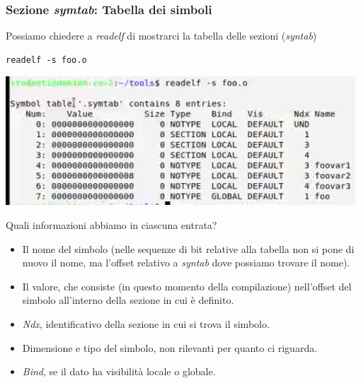 \documentclass[11pt]{report}
\theoremstyle{definition}
\begin{document}
\subsubsection{Sezione \emph{symtab}: Tabella dei simboli} Possiamo chiedere a \emph{readelf} di mostrarci la tabella delle sezioni (\emph{syntab})
\begin{verbatim}
readelf -s foo.o
\end{verbatim}\begin{center}
\includegraphics{img/55.PNG}
\end{center}  
Quali informazioni abbiamo in ciascuna entrata?
\begin{itemize}
\item Il nome del simbolo (nelle sequenze di bit relative alla tabella non si pone di nuovo il nome, ma l'offset relativo a \emph{syntab} dove possiamo trovare il nome).
\item Il valore, che consiste (in questo momento della compilazione) nell'offset del simbolo all'interno della sezione in cui è definito.
\item \emph{Ndx}, identificativo della sezione in cui si trova il simbolo.
\item Dimensione e tipo del simbolo, non rilevanti per quanto ci riguarda.
\item \emph{Bind}, se il dato ha visibilità locale o globale.
\end{itemize}
\end{document}
